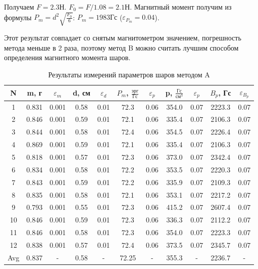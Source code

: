 \documentclass[a4paper, 12pt]{article}
\begin{document}
Получаем $F=2.3\text{Н}$. $F_0=F/1.08=2.1$Н. Магнитный момент получим из формулы
$P_m=d^2\sqrt{\frac{F_0}{6}}$: $P_m=1983\text{Гс}$ ($\varepsilon_{P_m}=0.04$).

Этот результат совпадает со снятым магнитометром значением, погрешность метода меньше
в 2 раза, поэтому метод B можно считать лучшим способом определения магнитного момента шаров.
\begin{table}[h]
\centering
\begin{tabular}{|c|c|c|c|c|c|c|c|c|c|c|}
\hline
N & m, г & $\varepsilon_m$ & d, см & $\varepsilon_d$ & $P_m$, $\frac{\text{эрг}}{\text{Гс}}$ & $\varepsilon_p$ & p, 
$\frac{\text{Гс}}{\text{см}^3}$ & $\varepsilon_p$ & $B_p$, Гс & $\varepsilon_{B_p}$ \\
\hline
1 & 0.831 & 0.001 & 0.58 & 0.01 &  72.3 & 0.06 & 354.0 & 0.07 & 2223.3 & 0.07 \\
2 & 0.846 & 0.001 & 0.59 & 0.01 &  72.1 & 0.06 & 335.4 & 0.07 & 2106.3 & 0.07 \\
3 & 0.844 & 0.001 & 0.58 & 0.01 &  72.4 & 0.06 & 354.5 & 0.07 & 2226.4 & 0.07 \\
4 & 0.869 & 0.001 & 0.59 & 0.01 &  72.1 & 0.06 & 335.4 & 0.07 & 2106.3 & 0.07 \\
5 & 0.818 & 0.001 & 0.57 & 0.01 &  72.3 & 0.06 & 373.0 & 0.07 & 2342.4 & 0.07 \\
6 & 0.834 & 0.001 & 0.58 & 0.01 &  72.2 & 0.06 & 353.5 & 0.07 & 2220.3 & 0.07 \\
7 & 0.843 & 0.001 & 0.59 & 0.01 &  72.2 & 0.06 & 335.9 & 0.07 & 2109.3 & 0.07 \\
8 & 0.835 & 0.001 & 0.58 & 0.01 &  72.1 & 0.06 & 353.1 & 0.07 & 2217.2 & 0.07 \\
9 & 0.793 & 0.001 & 0.55 & 0.01 &  72.3 & 0.06 & 415.2 & 0.07 & 2607.4 & 0.07 \\
10 & 0.846 & 0.001 & 0.59 & 0.01 & 72.3 & 0.06 & 336.3 & 0.07 & 2112.2 & 0.07 \\
11 & 0.846 & 0.001 & 0.58 & 0.01 & 72.3 & 0.06 & 354.0 & 0.07 & 2223.3 & 0.07 \\
12 & 0.838 & 0.001 & 0.57 & 0.01 & 72.4 & 0.06 & 373.5 & 0.07 & 2345.7 & 0.07 \\
\hline
Avg & 0.837 & - & 0.58 & - & 72.25 & - & 355.3 & - & 2236.7 & - \\
\hline
\end{tabular}
\caption{Результаты измерений параметров шаров методом A}
\label{tab:sphere_measurements}
\end{table}

\newpage
\end{document}
